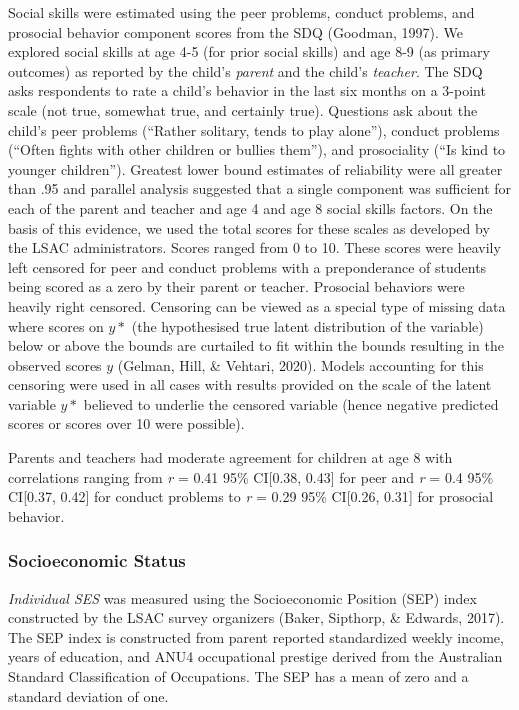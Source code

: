 \documentclass[
  english,
  man]{apa6}
\begin{document}
Social skills were estimated using the peer problems, conduct problems, and prosocial behavior component scores from the SDQ (Goodman, 1997). We explored social skills at age 4-5 (for prior social skills) and age 8-9 (as primary outcomes) as reported by the child's \emph{parent} and the child's \emph{teacher}. The SDQ asks respondents to rate a child's behavior in the last six months on a 3-point scale (not true, somewhat true, and certainly true). Questions ask about the child's peer problems (``Rather solitary, tends to play alone''), conduct problems (``Often fights with other children or bullies them''), and prosociality (``Is kind to younger children''). Greatest lower bound estimates of reliability were all greater than .95 and parallel analysis suggested that a single component was sufficient for each of the parent and teacher and age 4 and age 8 social skills factors. On the basis of this evidence, we used the total scores for these scales as developed by the LSAC administrators. Scores ranged from 0 to 10. These scores were heavily left censored for peer and conduct problems with a preponderance of students being scored as a zero by their parent or teacher. Prosocial behaviors were heavily right censored. Censoring can be viewed as a special type of missing data where scores on \(y*\) (the hypothesised true latent distribution of the variable) below or above the bounds are curtailed to fit within the bounds resulting in the observed scores \(y\) (Gelman, Hill, \& Vehtari, 2020). Models accounting for this censoring were used in all cases with results provided on the scale of the latent variable \(y*\) believed to underlie the censored variable (hence negative predicted scores or scores over 10 were possible).

Parents and teachers had moderate agreement for children at age 8 with correlations ranging from \emph{r} = 0.41 95\% CI{[}0.38, 0.43{]} for peer and \emph{r} = 0.4 95\% CI{[}0.37, 0.42{]} for conduct problems to \emph{r} = 0.29 95\% CI{[}0.26, 0.31{]} for prosocial behavior.

\hypertarget{socioeconomic-status}{%
\subsubsection{Socioeconomic Status}\label{socioeconomic-status}}

\emph{Individual SES} was measured using the Socioeconomic Position (SEP) index constructed by the LSAC survey organizers (Baker, Sipthorp, \& Edwards, 2017). The SEP index is constructed from parent reported standardized weekly income, years of education, and ANU4 occupational prestige derived from the Australian Standard Classification of Occupations. The SEP has a mean of zero and a standard deviation of one.
\end{document}

